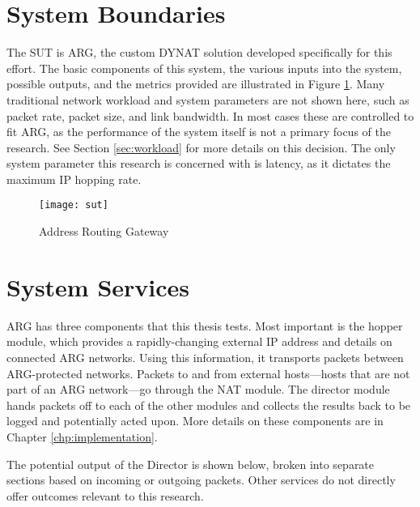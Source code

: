 \section{System Boundaries}
\label{sec:boundaries}
\par The \ac{SUT} is \ac{ARG}, the custom \ac{DYNAT} solution developed specifically for this effort. The basic components of this system, the various inputs into the system, possible outputs, and the metrics provided are illustrated in Figure \ref{fig:sut}. Many traditional network workload and system parameters are not shown here, such as packet rate, packet size, and link bandwidth. In most cases these are controlled to fit \ac{ARG}, as the performance of the system itself is not a primary focus of the research. See Section \ref{sec:workload} for more details on this decision. The only system parameter this research is concerned with is latency, as it dictates the maximum \ac{IP} hopping rate.

\begin{figure}
	\caption{Address Routing Gateway}
	\label{fig:sut}
	\centering
	\texttt{[image: sut]}
\end{figure}

\FloatBarrier
\section{System Services}
\label{sec:services}
\par \ac{ARG} has three components that this thesis tests. Most important is the hopper module, which provides a rapidly-changing external IP address and details on connected ARG networks. Using this information, it transports packets between ARG-protected networks. Packets to and from external hosts---hosts that are not part of an ARG network---go through the \ac{NAT} module. The director module hands packets off to each of the other modules and collects the results back to be logged and potentially acted upon. More details on these components are in Chapter \ref{chp:implementation}.

\par The potential output of the Director is shown below, broken into separate sections based on incoming or outgoing packets. Other services do not directly offer outcomes relevant to this research.

